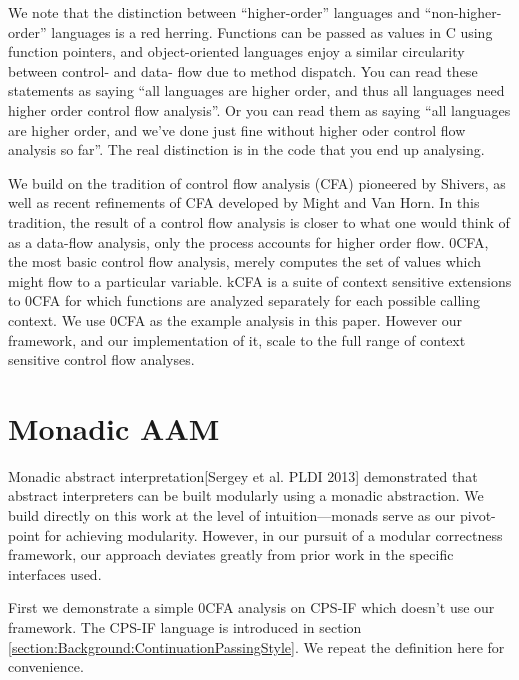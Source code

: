 \documentclass{article}
\begin{document}
We note that the distinction between “higher-order” languages and “non-higher-order” languages is a red herring.
Functions can be passed as values in C using function pointers, and object-oriented languages enjoy a similar circularity between control- and data- flow due to method dispatch.
You can read these statements as saying “all languages are higher order, and thus all languages need higher order control flow analysis”.
Or you can read them as saying “all languages are higher order, and we've done just fine without higher oder control flow analysis so far”.
The real distinction is in the code that you end up analysing.

We build on the tradition of control flow analysis (CFA) pioneered by Shivers, as well as recent refinements of CFA developed by Might and Van Horn.
In this tradition, the result of a control flow analysis is closer to what one would think of as a data-flow analysis, only the process accounts for higher order flow.
0CFA, the most basic control flow analysis, merely computes the set of values which might flow to a particular variable.
kCFA is a suite of context sensitive extensions to 0CFA for which functions are analyzed separately for each possible calling context.
We use 0CFA as the example analysis in this paper.
However our framework, and our implementation of it, scale to the full range of context sensitive control flow analyses.




\section{Monadic AAM}
\label{section:MonadicAAM}

Monadic abstract interpretation[Sergey et al. PLDI 2013] demonstrated that abstract interpreters can be built modularly using a monadic abstraction.
We build directly on this work at the level of intuition—monads serve as our pivot-point for achieving modularity.
However, in our pursuit of a modular correctness framework, our approach deviates greatly from prior work in the specific interfaces used.

First we demonstrate a simple 0CFA analysis on CPS-IF which doesn't use our framework.
The CPS-IF language is introduced in section \ref{section:Background:ContinuationPassingStyle}.
We repeat the definition here for convenience.

\end{document}
